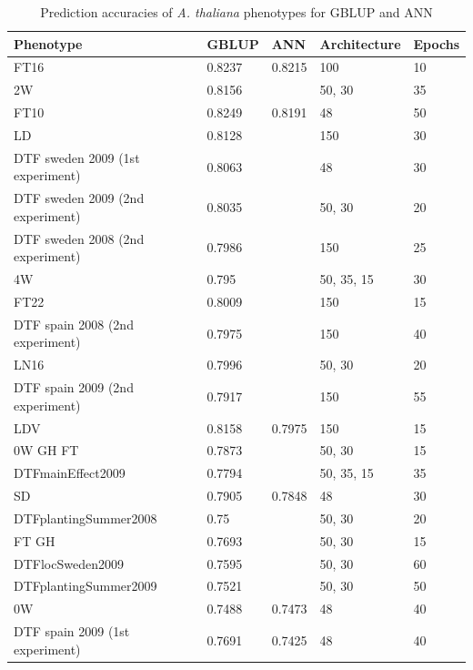 \singlespacing
\begin{longtable}{p{} p{} p{} p{} p{}}
  \caption[Prediction accuracies of \textit{A. thaliana} phenotypes for GBLUP and ANN]{Prediction accuracies of \textit{A. thaliana} phenotypes for GBLUP and ANN} \\
 \toprule
 Phenotype & GBLUP & ANN & Architecture & Epochs \\
 \midrule
 FT16 & 0.8237 & 0.8215 & 100 & 10 \\
 2W & 0.8156 & \color{red}{0.8205} & 50, 30 & 35 \\
 FT10 & 0.8249 & 0.8191 & 48 & 50 \\
 LD & 0.8128 & \color{red}{0.8159} & 150 & 30 \\
 DTF sweden 2009 (1st experiment) & 0.8063 & \color{red}{0.8141} & 48 & 30 \\
 DTF sweden 2009 (2nd experiment) & 0.8035 & \color{red}{0.8091} & 50, 30 & 20 \\
 DTF sweden 2008 (2nd experiment) & 0.7986 & \color{red}{0.8057} & 150 & 25 \\
 4W & 0.795 & \color{red}{0.8052} & 50, 35, 15 & 30 \\
 FT22 & 0.8009 & \color{red}{0.8043} & 150 & 15 \\
 DTF spain 2008 (2nd experiment) & 0.7975 & \color{red}{0.8032} & 150 & 40 \\
 LN16 & 0.7996 & \color{red}{0.7999} & 50, 30 & 20 \\
 DTF spain 2009 (2nd experiment) & 0.7917 & \color{red}{0.7988} & 150 & 55 \\
 LDV & 0.8158 & 0.7975 & 150 & 15 \\
 0W GH FT & 0.7873 & \color{red}{0.7942} & 50, 30 & 15 \\
 DTFmainEffect2009 & 0.7794 & \color{red}{0.7855} & 50, 35, 15 & 35 \\
 SD & 0.7905 & 0.7848 & 48 & 30 \\
 DTFplantingSummer2008 & 0.75 & \color{red}{0.7746} & 50, 30 & 20 \\
 FT GH & 0.7693 & \color{red}{0.7702} & 50, 30 & 15 \\
 DTFlocSweden2009 & 0.7595 & \color{red}{0.7626} & 50, 30 & 60 \\
 DTFplantingSummer2009 & 0.7521 & \color{red}{0.7584} & 50, 30 & 50 \\
 0W & 0.7488 & 0.7473 & 48 & 40 \\
 DTF spain 2009 (1st experiment) & 0.7691 & 0.7425 & 48 & 40 \\

\end{longtable}
